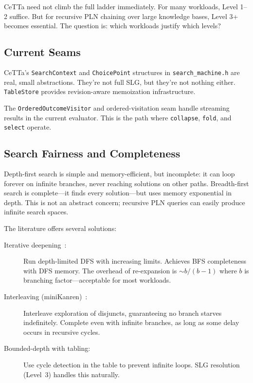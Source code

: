 \documentclass[11pt]{article}
\newcommand{\code}[1]{\texttt{#1}}
\newcommand{\CeTTa}{\textup{CeTTa}}
\begin{document}
\CeTTa{} need not climb the full ladder immediately.  For many workloads,
Level 1--2 suffice.  But for recursive PLN chaining over large knowledge
bases, Level 3+ becomes essential.  The question is: which workloads
justify which levels?

\subsection{Current Seams}

\CeTTa{}'s \code{SearchContext} and \code{ChoicePoint} structures in
\code{search\_machine.h} are real, small abstractions.  They're not
full SLG, but they're not nothing either.  \code{TableStore} provides
revision-aware memoization infrastructure.

The \code{OrderedOutcomeVisitor} and ordered-visitation seam handle
streaming results in the current evaluator.  This is the path where
\code{collapse}, \code{fold}, and \code{select} operate.

\subsection{Search Fairness and Completeness}

Depth-first search is simple and memory-efficient, but incomplete: it can
loop forever on infinite branches, never reaching solutions on other paths.
Breadth-first search is complete---it finds every solution---but uses
memory exponential in depth.  This is not an abstract concern; recursive
PLN queries can easily produce infinite search spaces.

The literature offers several solutions:
\begin{description}
\item[Iterative deepening~\cite{Korf1985}:] Run depth-limited DFS with
  increasing limits.  Achieves BFS completeness with DFS memory.  The
  overhead of re-expansion is $\sim b/(b{-}1)$ where $b$ is branching
  factor---acceptable for most workloads.
\item[Interleaving (miniKanren)~\cite{FriedmanByrd2005}:] Interleave
  exploration of disjuncts, guaranteeing no branch starves indefinitely.
  Complete even with infinite branches, as long as some delay occurs
  in recursive cycles.
\item[Bounded-depth with tabling:] Use cycle detection in the table to
  prevent infinite loops.  SLG resolution (Level~3) handles this naturally.
\end{description}
\end{document}
